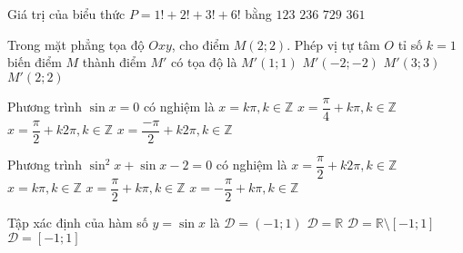 \begin{ex}%
Giá trị của biểu thức $P= 1!+2!+3!+6!$ bằng
\choice
{$123$}
{$236$}
{\True $729$}
{$361$}
\end{ex}

\begin{ex}%
Trong mặt phẳng tọa độ $Oxy$, cho điểm $M(2;2)$. Phép vị tự tâm $O$ tỉ số $k=1$ biến điểm $M$ thành điểm $M'$ có tọa độ là
\choice
{$M'(1;1)$}
{$M'(-2;-2)$}
{$M'(3;3)$}
{\True $M'(2;2)$}
\end{ex}

\begin{ex}%
Phương trình $\sin x =0$ có nghiệm là
\choice
{\True $x=k\pi, k\in \mathbb{Z}$}
{$x=\dfrac{\pi}{4}+k\pi, k\in \mathbb{Z}$}
{$x= \dfrac{\pi}{2}+ k2\pi, k\in \mathbb{Z}$}
{$x=\dfrac{-\pi}{2}+ k2\pi, k\in \mathbb{Z}$}
\end{ex}

\begin{ex}%
Phương trình $\sin^2 x +\sin x -2 =0$ có nghiệm là
\choice
{\True $x=\dfrac{\pi}{2}+k2\pi, k\in \mathbb{Z}$}
{$x=k\pi, k\in \mathbb{Z}$}
{$x=\dfrac{\pi}{2}+k\pi, k\in \mathbb{Z}$}
{$x=-\dfrac{\pi}{2}+k\pi, k\in \mathbb{Z}$}
\end{ex}

\begin{ex}%
Tập xác định của hàm số $y=\sin x$ là
\choice
	{$\mathscr{D} = (-1;1)$}
    {\True  $\mathscr{D} = \mathbb{R}$}
	{$\mathscr{D} = \mathbb{R} \setminus [-1;1]$}
	{$\mathscr{D} = [-1;1]$}
\end{ex}

